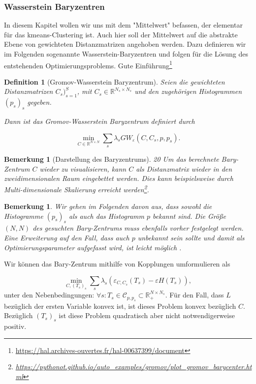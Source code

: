 \documentclass[twoside, 11pt,a4paper]{article}
\newtheorem{definition}[theorem]{Definition}
\newtheorem{remark}[theorem]{Bemerkung}
\numberwithin{equation}{section}
\begin{document}
\subsubsection{Wasserstein Baryzentren}
In diesem Kapitel wollen wir uns mit dem "Mittelwert" befassen, der elementar für das kmeans-Clustering ist.
Auch hier soll der Mittelwert auf die abstrakte Ebene von gewichteten Distanzmatrizen angehoben werden.
Dazu definieren wir im Folgenden sogenannte Wasserstein-Baryzentren und folgen \cite{gwd_averaging_kernels} für die Lösung des entstehenden Optimierungsproblems.
Gute Einführung\footnote{\url{https://hal.archives-ouvertes.fr/hal-00637399/document}}
\begin{definition}[Gromov-Wasserstein Baryzentrum]
	Seien die gewichteten Distanzmatrizen $C_s)_{s=1}^S$, mit $C_s \in \mathbb{R}^{N_s \times N_s}$ und den zugehörigen Histogrammen $(p_s)_s$ gegeben.
	
	Dann ist das Gromov-Wasserstein Baryzentrum definiert durch
	
	\begin{equation}
		\min_{C \in \mathbb{R}^{N \times N}} \sum_s{\lambda_s GW_{\varepsilon}(C,C_s,p,p_s)}.
	\end{equation}
\end{definition}

\begin{remark}[Darstellung des Baryzentrums]20
	Um das berechnete Bary-Zentrum $C$ wieder zu visualisieren, kann $C$ als Distanzmatrix wieder in den zweidimensionalen Raum eingebettet werden. Dies kann beispielsweise durch Multi-dimensionale Skalierung erreicht werden\footnote{\url{https://pythonot.github.io/auto_examples/gromov/plot_gromov_barycenter.html}}.  
	
\end{remark}

\begin{remark}
	Wir gehen im Folgenden davon aus, dass sowohl die Histogramme $(p_s)_s$ als auch das Histogramm $p$ bekannt sind. Die Größe $(N,N)$ des gesuchten Bary-Zentrums muss ebenfalls vorher festgelegt werden.
	Eine Erweiterung auf den Fall, dass auch $p$ unbekannt sein sollte und damit als Optimierungsparameter aufgefasst wird, ist leicht möglich \cite{gwd_averaging_kernels}.
\end{remark}

Wir können das Bary-Zentrum mithilfe von Kopplungen umformulieren als

\begin{equation}
	\min_{C,(T_s)_s}{\sum_s{\lambda_s(\varepsilon_{C,C_s}(T_s) - \varepsilon H(T_s))}}, \label{eq:bary_prob_reformulated}
\end{equation}
unter den Nebenbedingungen: $ \forall s: T_s \in \mathcal{C}_{p,p_s} \subset \mathbb{R}_{+}^{N \times N_s}$.
Für den Fall, dass $L$ bezüglich der ersten Variable konvex ist, ist dieses Problem konvex bezüglich $C$. Bezüglich $(T_s)_s$ ist diese Problem quadratisch aber nicht notwendigerweise positiv.
\end{document}
